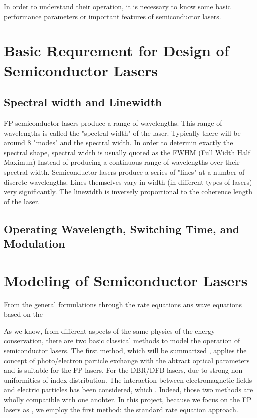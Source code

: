 In order to understand their operation, it is necessary to know some basic
performance parameters or important features of semiconductor lasers.

\section{Basic Requrement for Design of Semiconductor Lasers} \label{corrections}
\subsection{Spectral width and Linewidth}

FP semiconductor lasers produce a range of wavelengths. This range of
wavelengths is called the "spectral width" of the laser. Typically there will
be around 8 "modes" and the spectral width. In order to determin exactly the
spectral shape, spectral width is usually quoted as the FWHM (Full Width Half
Maximun) Instead of producing a continuous range of wavelengths over their
spectral width. Semiconductor lasers produce a series of "lines" at a number of
discrete wavelengths. Lines themselves vary in width (in different types of
lasers) very significantly. The linewidth is inversely proportional to the
coherence length of the laser.

\subsection{Operating Wavelength, Switching Time, and Modulation}
\section{Modeling of Semiconductor Lasers} \label{corrections}

From the general formulations through the rate equations ans wave equations
based on the

As we know, from different aspects of the same physics of the energy
conservation, there are two basic classical methods to model the operation of
semiconductor lasers. The first method, which will be summarized , applies the
concept of photo/electron particle exchange with the abtract optical parameters
and is suitable for the FP lasers. For the DBR/DFB lasers, due to strong
non-uniformities of index distribution. The interaction between electromagnetic
fields and electric particles has been considered, which . Indeed, those two
methods are wholly compatible with one anohter. In this project, because we
focus on the FP lasers as , we employ the first method: the standard rate
equation approach.

